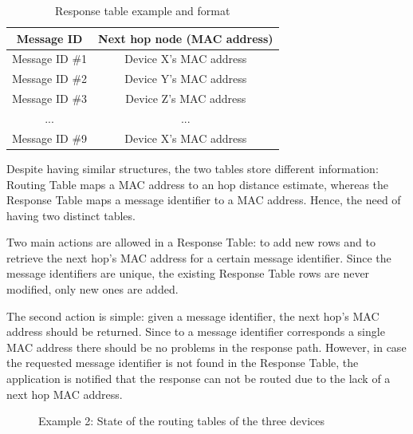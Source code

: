 \begin{table}[ht]
\centering
\bgroup
\def\arraystretch{2.5}
\begin{tabular}{|c|c|}
\hline
\textbf{Message ID} & \textbf{Next hop node (MAC address)} \\ \hline
Message ID \#1 & Device X's MAC address \\ \hline
Message ID \#2 & Device Y's MAC address \\ \hline
Message ID \#3 & Device Z's MAC address \\ \hline
... & ... \\ \hline
Message ID \#9 & Device X's MAC address \\ \hline
\end{tabular}
\egroup
\caption{Response table example and format}
\label{tab:rspTables}
\end{table}

Despite having similar structures, the two tables store different information: Routing Table maps a \gls{MAC} address to an hop distance estimate, whereas the Response Table maps a message identifier to a \gls{MAC} address. Hence, the need of having two distinct tables.

Two main actions are allowed in a Response Table: to add new rows and to retrieve the next hop's \gls{MAC} address for a certain message identifier. Since the message identifiers are unique, the existing Response Table rows are never modified, only new ones are added.

The second action is simple: given a message identifier, the next hop's \gls{MAC} address should be returned. Since to a message identifier corresponds a single \gls{MAC} address there should be no problems in the response path. However, in case the requested message identifier is not found in the Response Table, the application is notified that the response can not be routed due to the lack of a next hop \gls{MAC} address.


\begin{figure}[ht]
   \noindent{}
	\caption{\label{fig:example1.0} Example 2: State of the routing tables of the three devices}
\end{figure}

